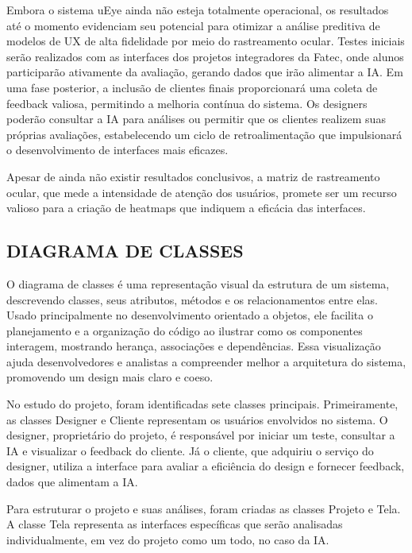 Embora o sistema uEye ainda não esteja totalmente operacional, os resultados até o momento evidenciam seu potencial para otimizar a análise preditiva de modelos de UX de alta fidelidade por meio do rastreamento ocular. Testes iniciais serão realizados com as interfaces dos projetos integradores da Fatec, onde alunos participarão ativamente da avaliação, gerando dados que irão alimentar a IA. Em uma fase posterior, a inclusão de clientes finais proporcionará uma coleta de feedback valiosa, permitindo a melhoria contínua do sistema. Os designers poderão consultar a IA para análises ou permitir que os clientes realizem suas próprias avaliações, estabelecendo um ciclo de retroalimentação que impulsionará o desenvolvimento de interfaces mais eficazes.

Apesar de ainda não existir resultados conclusivos, a matriz de rastreamento ocular, que mede a intensidade de atenção dos usuários, promete ser um recurso valioso para a criação de heatmaps que indiquem a eficácia das interfaces.\newline

\subsection*{DIAGRAMA DE CLASSES}
O diagrama de classes é uma representação visual da estrutura de um sistema, descrevendo classes, seus atributos, métodos e os relacionamentos entre elas. Usado principalmente no desenvolvimento orientado a objetos, ele facilita o planejamento e a organização do código ao ilustrar como os componentes interagem, mostrando herança, associações e dependências. Essa visualização ajuda desenvolvedores e analistas a compreender melhor a arquitetura do sistema, promovendo um design mais claro e coeso. \textcite{Lucidchart}

No estudo do projeto, foram identificadas sete classes principais. Primeiramente, as classes Designer e Cliente representam os usuários envolvidos no sistema. O designer, proprietário do projeto, é responsável por iniciar um teste, consultar a IA e visualizar o feedback do cliente. Já o cliente, que adquiriu o serviço do designer, utiliza a interface para avaliar a eficiência do design e fornecer feedback, dados que alimentam a IA.

Para estruturar o projeto e suas análises, foram criadas as classes Projeto e Tela. A classe Tela representa as interfaces específicas que serão analisadas individualmente, em vez do projeto como um todo, no caso da IA.

